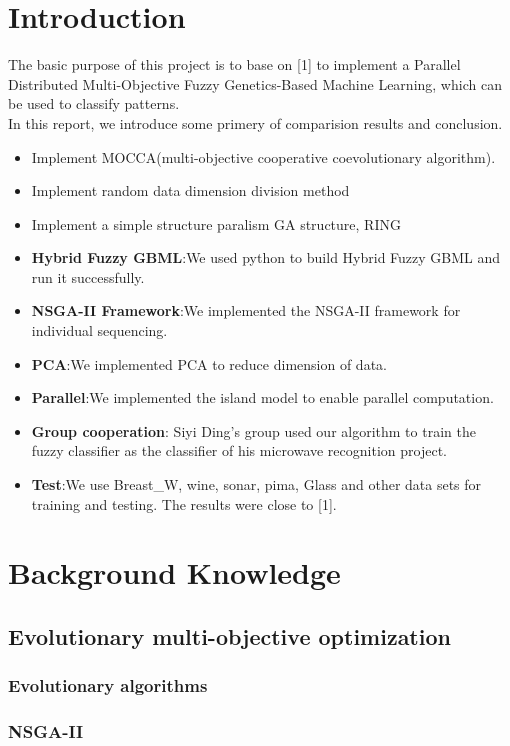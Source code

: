 \documentclass[conference,compsoc]{IEEEtran}
\begin{document}
\section{Introduction}
The basic purpose of this project is to base on [1] to implement a Parallel Distributed Multi-Objective Fuzzy Genetics-Based Machine Learning, which can be used to classify patterns.
\\
 \indent In this report, we introduce some primery of comparision results and conclusion.
\begin{itemize}
	\item Implement MOCCA(multi-objective cooperative coevolutionary algorithm).
	\item Implement random data dimension division method
	\item Implement a simple structure paralism GA structure, RING
	\item \textbf{Hybrid Fuzzy GBML}:We used python to build Hybrid Fuzzy GBML and run it successfully.
	\item \textbf{NSGA-II Framework}:We implemented the NSGA-II framework for individual sequencing.
	\item \textbf{PCA}:We implemented PCA to reduce dimension of data.
	\item \textbf{Parallel}:We implemented the island model to enable parallel computation.
	\item \textbf{Group cooperation}: Siyi Ding's group used our algorithm to train the fuzzy classifier as the classifier of his microwave recognition project.
	\item \textbf{Test}:We use Breast\_W, wine, sonar, pima, Glass and other data sets for training and testing. The results were close to [1].
\end{itemize}


\section{Background Knowledge }
\subsection{Evolutionary multi-objective optimization}

\subsubsection{Evolutionary algorithms}

\subsubsection{NSGA-II }
\end{document}
